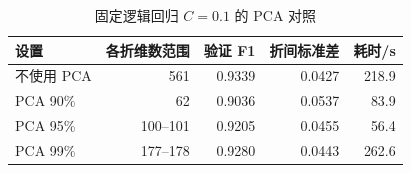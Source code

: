 \begin{table}[htbp]\centering\small
\caption{固定逻辑回归 $C=0.1$ 的 PCA 对照}\label{tab:pca}
\begin{tabular}{lrrrr}\toprule
设置 & 各折维数范围 & 验证 F1 & 折间标准差 & 耗时/s\\\midrule
不使用 PCA & 561 & 0.9339 & 0.0427 & 218.9\\
PCA 90\% & 62 & 0.9036 & 0.0537 & 83.9\\
PCA 95\% & 100--101 & 0.9205 & 0.0455 & 56.4\\
PCA 99\% & 177--178 & 0.9280 & 0.0443 & 262.6\\
\bottomrule\end{tabular}
\end{table}
